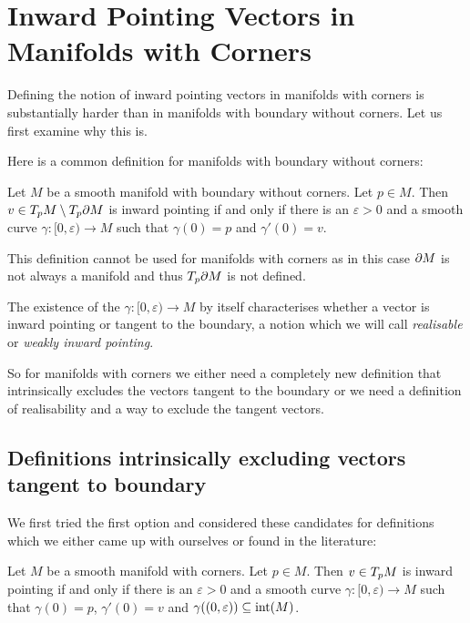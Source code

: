\chapter{Inward Pointing Vectors in Manifolds with Corners}

Defining the notion of inward pointing vectors in manifolds with corners is substantially harder than in manifolds with boundary without corners. Let us first examine why this is. 

Here is a common definition for manifolds with boundary without corners:

\begin{defi}\label{defi:InwLee1}
    Let $M$ be a smooth manifold with boundary without corners. Let $p \in M$. Then $v \in T_{p}M \setminus T_{p}\partial M$ is inward pointing if and only if there is an $\varepsilon > 0$ and a smooth curve $\gamma \colon [0, \varepsilon) \to M$ such that $\gamma (0) = p$ and $\gamma' (0) = v$.
\end{defi}

This definition cannot be used for manifolds with corners as in this case $\partial M$ is not always a manifold and thus $T_{p}\partial M$ is not defined. 

The existence of the $\gamma \colon [0, \varepsilon) \to M$ by itself characterises whether a vector is inward pointing or tangent to the boundary, a notion which we will call \emph{realisable} or \emph{weakly inward pointing}. 

So for manifolds with corners we either need a completely new definition that intrinsically excludes the vectors tangent to the boundary or we need a definition of realisability and a way to exclude the tangent vectors. 

\section{Definitions intrinsically excluding vectors tangent to boundary}

We first tried the first option and considered these candidates for definitions which we either came up with ourselves or found in the literature: 

\begin{defi}
    Let $M$ be a smooth manifold with corners. 
    Let $p \in M$. Then $v \in T_{p}M$ is inward pointing if and only if there is an $\varepsilon > 0$ and a smooth curve $\gamma \colon [0, \varepsilon) \to M$ such that $\gamma (0) = p$, $\gamma' (0) = v$ and $\gamma ((0, \varepsilon)) \subseteq \text{int}(M)$.
\end{defi}

